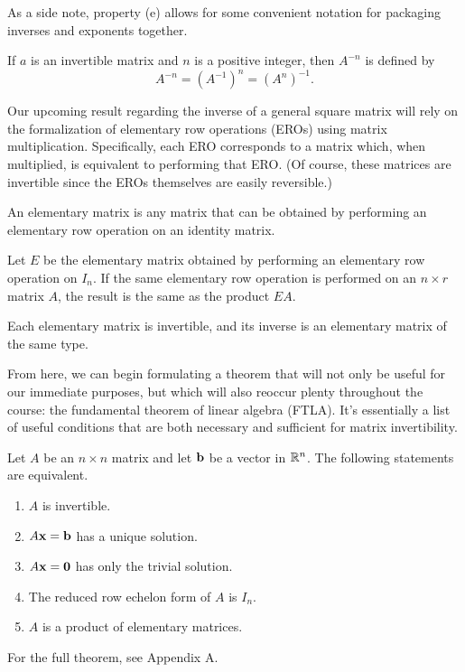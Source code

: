\documentclass[../m073main.tex]{subfiles}
\begin{document}
As a side note, property (e) allows for some convenient notation for packaging inverses and exponents together.

\begin{definition}
	If $a$ is an invertible matrix and $n$ is a positive integer, then $A^{-n}$ is defined by
	\[ A^{-n} = (A^{-1})^n = (A^n)^{-1}. \]
\end{definition}

Our upcoming result regarding the inverse of a general square matrix will rely on the formalization of elementary row operations (EROs) using matrix multiplication.
Specifically, each ERO corresponds to a matrix which, when multiplied, is equivalent to performing that ERO.
(Of course, these matrices are invertible since the EROs themselves are easily reversible.)

\begin{definition}
	An elementary matrix is any matrix that can be obtained by performing an elementary row operation on an identity matrix.
\end{definition}

\begin{theorem}
	Let $E$ be the elementary matrix obtained by performing an elementary row operation on $I_n$.
	If the same elementary row operation is performed on an $n\times r$ matrix $A$, the result is the same as the product $EA$.
\end{theorem}

\begin{theorem}
	Each elementary matrix is invertible, and its inverse is an elementary matrix of the same type.
\end{theorem}

From here, we can begin formulating a theorem that will not only be useful for our immediate purposes, but which will also reoccur plenty throughout the course: the fundamental theorem of linear algebra (FTLA).
It's essentially a list of useful conditions that are both necessary and sufficient for matrix invertibility.

\begin{theorem}
	Let $A$ be an $n\times n$ matrix and let $\mathbf{b}$ be a vector in $\mathbb{R}^n$.
	The following statements are equivalent.
	\begin{multicols}{2}
		\begin{enumerate}[label=(\alph*)]
			\item $A$ is invertible.
			\item $A\mathbf{x}= \mathbf{b}$ has a unique solution.
			\item $A\mathbf{x}=\mathbf{0}$ has only the trivial solution.
			\item The reduced row echelon form of $A$ is $I_n$.
			\item $A$ is a product of elementary matrices.
		\end{enumerate}
	\end{multicols}
	For the full theorem, see Appendix A.
\end{theorem}
\end{document}

